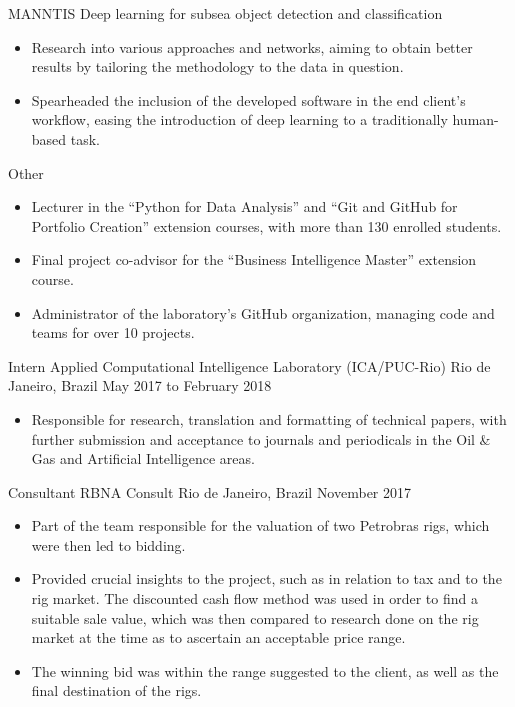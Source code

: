 \cvsubjob
    {MANNTIS}
    {Deep learning for subsea object detection and classification}

\begin{itemize}
    \item Research into various approaches and networks, aiming to obtain better results by tailoring the methodology to
    the data in question.
    \item Spearheaded the inclusion of the developed software in the end client's workflow, easing the introduction of
    deep learning to a traditionally human-based task.
\end{itemize}

\cvsubjob
    {Other}
    {}
    {}

\begin{itemize}
    \item Lecturer in the ``Python for Data Analysis'' and ``Git and GitHub for Portfolio Creation'' extension courses,
    with more than 130 enrolled students.
    \item Final project co-advisor for the ``Business Intelligence Master'' extension course.
    \item Administrator of the laboratory's GitHub organization, managing code and teams for over 10 projects.
\end{itemize}

\cvjob
    {Intern}
    {Applied Computational Intelligence Laboratory (ICA/PUC-Rio)}
    {Rio de Janeiro, Brazil}
    {May 2017 to February 2018}

\begin{itemize}
    \item Responsible for research, translation and formatting of technical papers, with further submission and
    acceptance to journals and periodicals in the Oil \& Gas and Artificial Intelligence areas.
\end{itemize}

\cvjob
    {Consultant}
    {RBNA Consult}
    {Rio de Janeiro, Brazil}
    {November 2017}

\begin{itemize}
    \item Part of the team responsible for the valuation of two Petrobras rigs, which were then led to bidding.
    \item Provided crucial insights to the project, such as in relation to tax and to the rig market.
    The discounted cash flow method was used in order to find a suitable sale value, which was then compared to research
    done on the rig market at the time as to ascertain an acceptable price range.
    \item The winning bid was within the range suggested to the client, as well as the final destination of the rigs.

\end{itemize}

